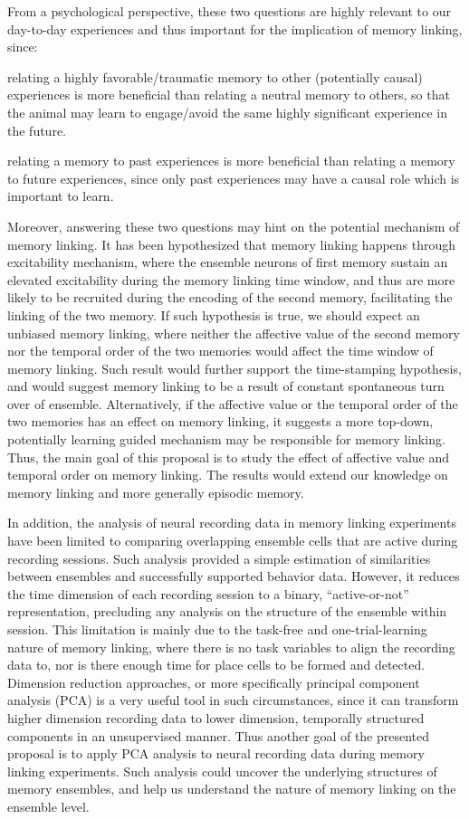 \documentclass[master.tex]{subfiles}
\begin{document}
From a psychological perspective, these two questions are highly relevant to our
day-to-day experiences and thus important for the implication of memory linking,
since:
\begin{inparaenum}[a)]
\item relating a highly favorable/traumatic memory to other (potentially causal)
  experiences is more beneficial than relating a neutral memory to others, so
  that the animal may learn to engage/avoid the same highly significant
  experience in the future.
\item relating a memory to past experiences is more beneficial than relating a
  memory to future experiences, since only past experiences may have a causal
  role which is important to learn.
\end{inparaenum}
Moreover, answering these two questions may hint on the potential mechanism of
memory linking. It has been hypothesized that memory linking happens through
excitability mechanism, where the ensemble neurons of first memory sustain an
elevated excitability during the memory linking time window, and thus are more
likely to be recruited during the encoding of the second memory, facilitating
the linking of the two memory. If such hypothesis is true, we should expect an
unbiased memory linking, where neither the affective value of the second memory
nor the temporal order of the two memories would affect the time window of
memory linking. Such result would further support the time-stamping hypothesis,
and would suggest memory linking to be a result of constant spontaneous turn
over of ensemble. Alternatively, if the affective value or the temporal order of
the two memories has an effect on memory linking, it suggests a more top-down,
potentially learning guided mechanism may be responsible for memory linking.
Thus, the main goal of this proposal is to study the effect of affective value
and temporal order on memory linking. The results would extend our knowledge on
memory linking and more generally episodic memory.

In addition, the analysis of neural recording data in memory linking experiments
have been limited to comparing overlapping ensemble cells that are active during
recording sessions. Such analysis provided a simple estimation of
similarities between ensembles and successfully supported behavior data.
However, it reduces the time dimension of each recording session to a binary,
``active-or-not'' representation, precluding any analysis on the structure of
the ensemble within session. This limitation is mainly due to the task-free and
one-trial-learning nature of memory linking, where there is no task
variables to align the recording data to, nor is there enough time for place
cells to be formed and detected. Dimension reduction approaches, or more
specifically principal component analysis (PCA) is a very useful tool in such
circumstances, since it can transform higher dimension recording data to lower
dimension, temporally structured components in an unsupervised manner. Thus
another goal of the presented proposal is to apply PCA analysis to neural
recording data during memory linking experiments. Such analysis could uncover
the underlying structures of memory ensembles, and help us understand the nature
of memory linking on the ensemble level.
\end{document}
